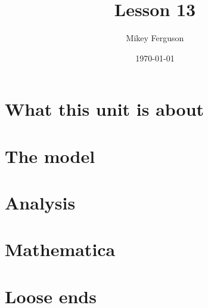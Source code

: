 \documentclass[11pt]{article}
\title{Lesson 13}
\author{Mikey Ferguson}
\date{\today}
\begin{document}
\maketitle
\tableofcontents
\bigskip

\section{What this unit is about}

\section{The model}

\section{Analysis}

\section{Mathematica}

\section{Loose ends}
\end{document}
